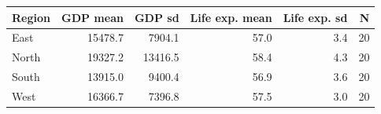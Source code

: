 
\begin{tabular}{lrrrrr}
\toprule
Region & GDP mean & GDP sd & Life exp. mean & Life exp. sd & N\\
\midrule
East & 15478.7 & 7904.1 & 57.0 & 3.4 & 20\\
North & 19327.2 & 13416.5 & 58.4 & 4.3 & 20\\
South & 13915.0 & 9400.4 & 56.9 & 3.6 & 20\\
West & 16366.7 & 7396.8 & 57.5 & 3.0 & 20\\
\bottomrule
\end{tabular}
